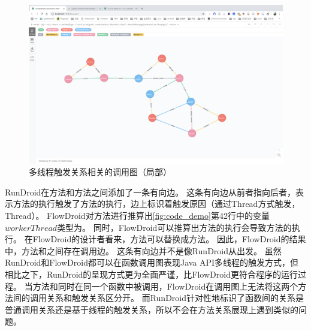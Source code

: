 \begin{figure}[ht]
	\centering
	\includegraphics[width=\textwidth]{./Figures/android-handler-rundroid.png}
	\caption{多线程触发关系相关的调用图（局部）}
	\label{fig:rundroid-result-handler}
\end{figure}







RunDroid在方法和方法之间添加了一条有向边。
这条有向边从前者指向后者，表示方法的执行触发了方法的执行，边上标识着触发原因（通过Thread方式触发，Thread）。
FlowDroid对方法进行推算出\autoref{fig:code_demo}第42行中的变量$workerThread$类型为。
同时，FlowDroid可以推算出方法的执行会导致方法的执行。
在FlowDroid的设计者看来，方法可以替换成方法。
因此，FlowDroid的结果中，方法和之间存在调用边。
这条有向边并不是像RunDroid从出发。
虽然RunDroid和FlowDroid都可以在函数调用图表现Java API多线程的触发方式，但相比之下，RunDroid的呈现方式更为全面严谨，比FlowDroid更符合程序的运行过程。
当方法和同时在同一个函数中被调用，FlowDroid在调用图上无法将这两个方法间的调用关系和触发关系区分开。
而RunDroid针对性地标识了函数间的关系是普通调用关系还是基于线程的触发关系，所以不会在方法关系展现上遇到类似的问题。


